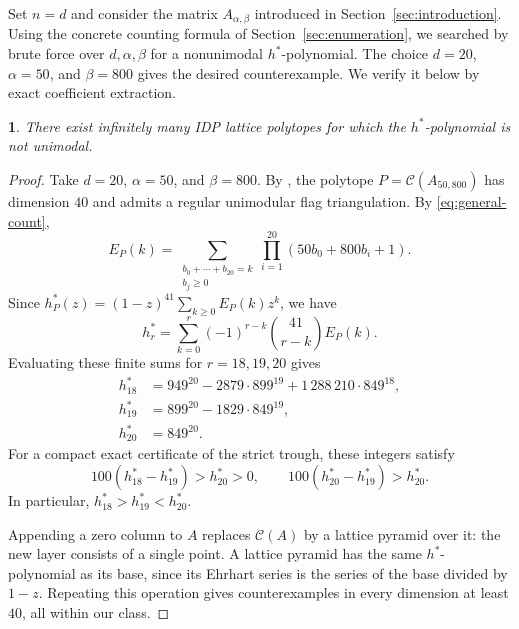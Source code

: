 \documentclass[11pt, letterpaper, english]{amsart}
\theoremstyle{teoremas}
\newcommand{\repeatedtheoremname}{}
\newtheorem*{repeatedtheorem}{\repeatedtheoremname}
\newenvironment{restate}[1]{%
  \renewcommand{\repeatedtheoremname}{Theorem~\hyperref[#1]{\ref*{#1}}}%
  \begin{repeatedtheorem}%
}{\end{repeatedtheorem}}
\theoremstyle{definition}
\newcommand{\cC}{\mathcal C}
\begin{document}
Set $n=d$ and consider the matrix $A_{\alpha,\beta}$ introduced in
Section~\ref{sec:introduction}. Using the concrete counting formula
of Section~\ref{sec:enumeration}, we searched by brute force over
$d,\alpha,\beta$ for a nonunimodal $h^*$-polynomial. The choice
$d=20$, $\alpha=50$, and $\beta=800$ gives the desired counterexample.
We verify it below by exact coefficient extraction.

\begin{restate}{thm:main-unimodality}
There exist infinitely many IDP lattice polytopes for which the $h^*$-polynomial is not unimodal.
\end{restate}


\begin{proof}
Take $d=20$, $\alpha=50$, and $\beta=800$.
By , the polytope
$P=\cC(A_{50,800})$ has dimension $40$ and admits a regular
unimodular flag triangulation. By \eqref{eq:general-count},
\[
 E_P(k)=\sum_{\substack{b_0+\cdots+b_{20}=k\\b_j\ge0}}
              \prod_{i=1}^{20}(50b_0+800b_i+1).
\]
Since $h_P^*(z)=(1-z)^{41}\sum_{k\ge0}E_P(k)z^k$, we have
\begin{equation}\label{eq:coefficient-extraction}
 h_r^*=\sum_{k=0}^r(-1)^{r-k}\binom{41}{r-k}E_P(k).
\end{equation}
Evaluating these finite sums for $r=18,19,20$ gives
\begin{align*}
 h_{18}^*&=949^{20}-2879\cdot899^{19}+1\,288\,210\cdot849^{18},\\
 h_{19}^*&=899^{20}-1829\cdot849^{19},\\
 h_{20}^*&=849^{20}.
\end{align*}
For a compact exact certificate of the strict trough, these integers satisfy
\[
 100(h_{18}^*-h_{19}^*)>h_{20}^*>0,
 \qquad 100(h_{20}^*-h_{19}^*)>h_{20}^*.
\]
In particular, $h_{18}^*>h_{19}^*<h_{20}^*$.

Appending a zero column to $A$ replaces $\cC(A)$ by a lattice
pyramid over it: the new layer consists of a single point.
A lattice pyramid has the same $h^*$-polynomial as its base, since
its Ehrhart series is the series of the base divided by $1-z$.
Repeating this operation gives counterexamples in every dimension
at least $40$, all within our class.
\end{proof}
\end{document}
